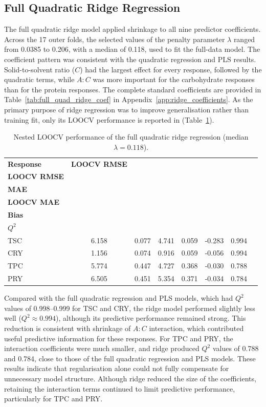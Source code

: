 \documentclass[MScDSA]{uccthesis}
\begin{document}
\subsection{Full Quadratic Ridge Regression}
\label{sec:full_quad_ridge_reg}
The full quadratic ridge model applied shrinkage to all nine predictor coefficients. Across the 17 outer folds, the selected values of the penalty parameter $\lambda$ ranged from 0.0385 to 0.206, with a median of 0.118, used to fit the full-data model. The coefficient pattern was consistent with the quadratic regression and PLS results. Solid-to-solvent ratio ($C$) had the largest effect for every response, followed by the quadratic terms, while $A:C$ was more important for the carbohydrate responses than for the protein responses. The complete standard coefficients are provided in Table~\ref{tab:full_quad_ridge_coef} in Appendix~\ref{app:ridge_coefficients}. As the primary purpose of ridge regression was to improve generalisation rather than training fit, only its LOOCV performance is reported in (Table~\ref{tab:full_ridge_loocv}). 

\begin{table}[H]
\centering
\fontsize{10}{12}\selectfont
\setlength{\tabcolsep}{4pt}
\caption{Nested LOOCV performance of the full quadratic ridge regression (median $\lambda = 0.118$).}
\label{tab:full_ridge_loocv}
\begin{tabular}{lccccccc}
\toprule
\textbf{Response} & \textbf{LOOCV RMSE} & \makecell{\textbf{Scaled}\\\textbf{LOOCV RMSE}} & \makecell{\textbf{LOOCV}\\\textbf{MAE}} & \makecell{\textbf{Scaled}\\\textbf{LOOCV MAE}} & \makecell{\textbf{LOOCV}\\\textbf{Bias}} & \makecell{\textbf{Predictive}\\\textbf{$Q^2$}} \\
\midrule
TSC & 6.158 & 0.077 & 4.741 & 0.059 & -0.283 & 0.994 \\
CRY & 1.156 & 0.074 & 0.916 & 0.059 & -0.056 & 0.994 \\
TPC & 5.774 & 0.447 & 4.727 & 0.368 & -0.030 & 0.788 \\
PRY & 6.505 & 0.451 & 5.354 & 0.371 & -0.034 & 0.784 \\
\bottomrule
\end{tabular}
\end{table}

Compared with the full quadratic regression and PLS models, which had $Q^2$ values of 0.998--0.999 for TSC and CRY, the ridge model performed slightly less well ($Q^2 \approx 0.994$), although its predictive performance remained strong. This reduction is consistent with shrinkage of $A:C$ interaction, which contributed useful predictive information for these responses. For TPC and PRY, the interaction coefficients were much smaller, and ridge produced $Q^2$ values of 0.788 and 0.784, close to those of the full quadratic regression and PLS models. These results indicate that regularisation alone could not fully compensate for unnecessary model structure. Although ridge  reduced the size of the coefficients, retaining the interaction terms continued to limit predictive performance, particularly for TPC and PRY.
\end{document}
